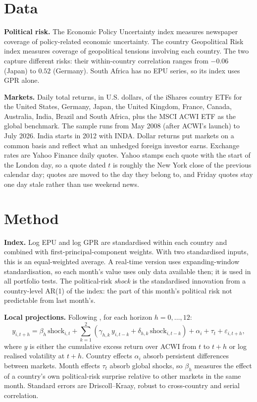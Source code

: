 \documentclass[11pt]{article}
\begin{document}
\section{Data}
\textbf{Political risk.} The Economic Policy Uncertainty index \citep{bbd2016} measures newspaper coverage of policy-related economic uncertainty. The country Geopolitical Risk index \citep{ci2022} measures coverage of geopolitical tensions involving each country. The two capture different risks: their within-country correlation ranges from $-0.06$ (Japan) to $0.52$ (Germany). South Africa has no EPU series, so its index uses GPR alone.

\textbf{Markets.} Daily total returns, in U.S. dollars, of the iShares country ETFs for the United States, Germany, Japan, the United Kingdom, France, Canada, Australia, India, Brazil and South Africa, plus the MSCI ACWI ETF as the global benchmark. The sample runs from May 2008 (after ACWI's launch) to July 2026. India starts in 2012 with INDA. Dollar returns put markets on a common basis and reflect what an unhedged foreign investor earns. Exchange rates are Yahoo Finance daily quotes. Yahoo stamps each quote with the start of the London day, so a quote dated $t$ is roughly the New York close of the previous calendar day; quotes are moved to the day they belong to, and Friday quotes stay one day stale rather than use weekend news.

\section{Method}
\textbf{Index.} Log EPU and log GPR are standardised within each country and combined with first-principal-component weights. With two standardised inputs, this is an equal-weighted average. A real-time version uses expanding-window standardisation, so each month's value uses only data available then; it is used in all portfolio tests. The political-risk \emph{shock} is the standardised innovation from a country-level AR(1) of the index: the part of this month's political risk not predictable from last month's.

\textbf{Local projections.} Following \citet{jorda2005}, for each horizon $h = 0,\dots,12$:
\begin{equation}
y_{i,t+h} = \beta_h\, \text{shock}_{i,t} + \sum_{k=1}^{2}\left(\gamma_{h,k}\, y_{i,t-k} + \delta_{h,k}\, \text{shock}_{i,t-k}\right) + \alpha_i + \tau_t + \varepsilon_{i,t+h},
\end{equation}
where $y$ is either the cumulative excess return over ACWI from $t$ to $t+h$ or log realised volatility at $t+h$. Country effects $\alpha_i$ absorb persistent differences between markets. Month effects $\tau_t$ absorb global shocks, so $\beta_h$ measures the effect of a country's own political-risk surprise relative to other markets in the same month. Standard errors are Driscoll--Kraay, robust to cross-country and serial correlation.
\end{document}
